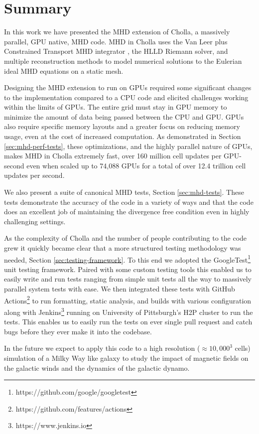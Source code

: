 \section{Summary}
\label{sec:summary}

In this work we have presented the MHD extension of Cholla, a massively parallel, GPU native, MHD code. MHD in Cholla uses the Van Leer plus Constrained Transport MHD integrator \citep{stone_2009}, the HLLD Riemann solver, and multiple reconstruction methods to model numerical solutions to the Eulerian ideal MHD equations on a static mesh.

Designing the MHD extension to run on GPUs required some significant changes to the implementation compared to a CPU code and elicited challenges working within the limits of GPUs. The entire grid must stay in GPU memory to minimize the amount of data being passed between the CPU and GPU. GPUs also require specific memory layouts and a greater focus on reducing memory usage, even at the cost of increased computation. As demonstrated in Section \ref{sec:mhd-perf-tests}, these optimizations, and the highly parallel nature of GPUs, makes MHD in Cholla extremely fast, over 160 million cell updates per GPU-second even when scaled up to 74,088 GPUs for a total of over 12.4 trillion cell updates per second. 

We also present a suite of canonical MHD tests, Section \ref{sec:mhd-tests}. These tests demonstrate the accuracy of the code in a variety of ways and that the code does an excellent job of maintaining the divergence free condition even in highly challenging settings. 

As the complexity of Cholla and the number of people contributing to the code grew it quickly became clear that a more structured testing methodology was needed, Section \ref{sec:testing-framework}. To this end we adopted the GoogleTest\footnote{https://github.com/google/googletest} unit testing framework. Paired with some custom testing tools this enabled us to easily write and run tests ranging from simple unit tests all the way to massively parallel system tests with ease. We then integrated these tests with GitHub Actions\footnote{https://github.com/features/actions} to run formatting, static analysis, and builds with various configuration along with Jenkins\footnote{https://www.jenkins.io} running on University of Pittsburgh's H2P cluster to run the tests. This enables us to easily run the tests on ever single pull request and catch bugs before they ever make it into the codebase.

In the future we expect to apply this code to a high resolution ($\approx 10,000^3$ cells) simulation of a Milky Way like galaxy to study the impact of magnetic fields on the galactic winds and the dynamics of the galactic dynamo.